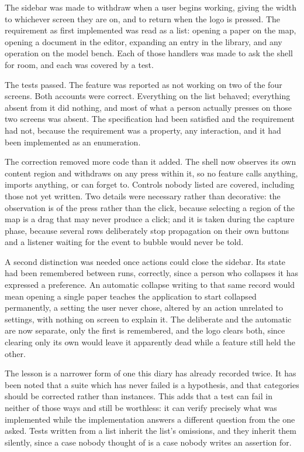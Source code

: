 \documentclass[11pt,a4paper]{article}
\begin{document}
The sidebar was made to withdraw when a user begins working, giving the width
to whichever screen they are on, and to return when the logo is pressed. The
requirement as first implemented was read as a list: opening a paper on the map,
opening a document in the editor, expanding an entry in the library, and any
operation on the model bench. Each of those handlers was made to ask the shell
for room, and each was covered by a test.

The tests passed. The feature was reported as not working on two of the four
screens. Both accounts were correct. Everything on the list behaved; everything
absent from it did nothing, and most of what a person actually presses on those
two screens was absent. The specification had been satisfied and the requirement
had not, because the requirement was a property, any interaction, and it
had been implemented as an enumeration.

The correction removed more code than it added. The shell now observes its own
content region and withdraws on any press within it, so no feature calls
anything, imports anything, or can forget to. Controls nobody listed are covered,
including those not yet written. Two details were necessary rather than
decorative: the observation is of the press rather than the click, because
selecting a region of the map is a drag that may never produce a click; and it
is taken during the capture phase, because several rows deliberately stop
propagation on their own buttons and a listener waiting for the event to bubble
would never be told.

A second distinction was needed once actions could close the sidebar. Its state
had been remembered between runs, correctly, since a person who collapses it has
expressed a preference. An automatic collapse writing to that same record would
mean opening a single paper teaches the application to start collapsed
permanently, a setting the user never chose, altered by an action unrelated to
settings, with nothing on screen to explain it. The deliberate and the automatic
are now separate, only the first is remembered, and the logo clears both, since
clearing only its own would leave it apparently dead while a feature still held
the other.

The lesson is a narrower form of one this diary has already recorded twice. It
has been noted that a suite which has never failed is a hypothesis, and that
categories should be corrected rather than instances. This adds that a test can
fail in neither of those ways and still be worthless: it can verify precisely
what was implemented while the implementation answers a different question from
the one asked. Tests written from a list inherit the list's omissions, and they
inherit them silently, since a case nobody thought of is a case nobody writes an
assertion for.
\end{document}
